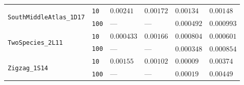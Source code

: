 \begin{footnotesize}
\begin{tabular}{llllll}
\cline{1-6}
\multirow[c]{2}{*}{\texttt{SouthMiddleAtlas\_1D17}} & \texttt{10} & $0.00241$ & $0.00172$ & $0.00134$ & $0.00148$ \\
 & \texttt{100} & --- & --- & $0.000492$ & $0.000993$ \\
\cline{1-6}
\multirow[c]{2}{*}{\texttt{TwoSpecies\_2L11}} & \texttt{10} & $0.000433$ & $0.00166$ & $0.000804$ & $0.000601$ \\
 & \texttt{100} & --- & --- & $0.000348$ & $0.000854$ \\
\cline{1-6}
\multirow[c]{2}{*}{\texttt{Zigzag\_1S14}} & \texttt{10} & $0.00155$ & $0.00102$ & $0.00009$ & $0.00374$ \\
 & \texttt{100} & --- & --- & $0.00019$ & $0.00449$ \\
\cline{1-6}
\bottomrule
\end{tabular}
\end{footnotesize}
